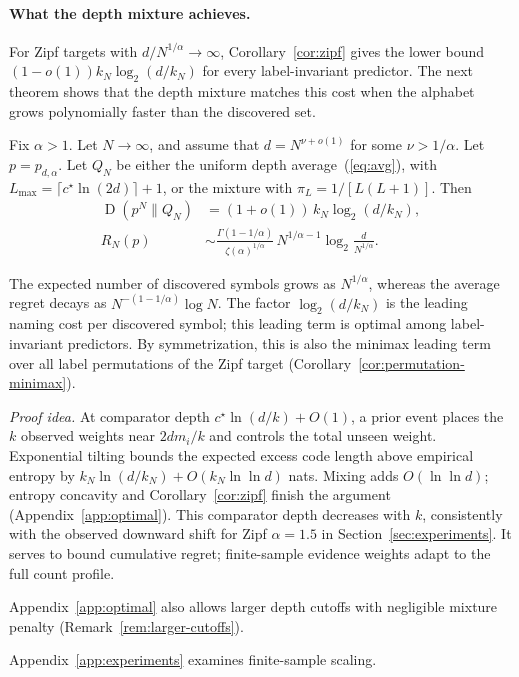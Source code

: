 \documentclass[anon]{alt2027}
\newcommand{\cstar}{c^{\star}}
\newcommand{\Lmax}{L_{\max}}
\newcommand{\KL}{\operatorname{D}}
\renewcommand{\eqref}[1]{(\ref{#1})}
\begin{document}
\paragraph{What the depth mixture achieves.}
For Zipf targets with $d/N^{1/\alpha}\to\infty$, Corollary~\ref{cor:zipf} gives the lower bound $(1-o(1))k_N\log_2(d/k_N)$ for every label-invariant predictor. The next theorem shows that the depth mixture matches this cost when the alphabet grows polynomially faster than the discovered set.
\begin{theorem}
\label{thm:optimal}
Fix $\alpha>1$. Let $N\to\infty$, and assume that $d=N^{\nu+o(1)}$ for some $\nu>1/\alpha$. Let $p=p_{d,\alpha}$. Let $Q_N$ be either the uniform depth average~\eqref{eq:avg}, with $\Lmax=\lceil\cstar\ln(2d)\rceil+1$, or the mixture with $\pi_L=1/[L(L+1)]$. Then
\begin{align}
\label{eq:optimal}
\KL(p^N\|Q_N)&=(1+o(1))\,k_N\log_2(d/k_N),\\
R_N(p)&\sim\frac{\Gamma(1-1/\alpha)}{\zeta(\alpha)^{1/\alpha}}\,N^{1/\alpha-1}\log_2\frac{d}{N^{1/\alpha}}.\nonumber
\end{align}
\end{theorem}
The expected number of discovered symbols grows as $N^{1/\alpha}$, whereas the average regret decays as $N^{-(1-1/\alpha)}\log N$. The factor $\log_2(d/k_N)$ is the leading naming cost per discovered symbol; this leading term is optimal among label-invariant predictors.
By symmetrization, this is also the minimax leading term over all label permutations of the Zipf target (Corollary~\ref{cor:permutation-minimax}).

\emph{Proof idea.} At comparator depth $\cstar\ln(d/k)+O(1)$, a prior event places the $k$ observed weights near $2dm_i/k$ and controls the total unseen weight. Exponential tilting bounds the expected excess code length above empirical entropy by $k_N\ln(d/k_N)+O(k_N\ln\ln d)$ nats. Mixing adds $O(\ln\ln d)$; entropy concavity and Corollary~\ref{cor:zipf} finish the argument (Appendix~\ref{app:optimal}). This comparator depth decreases with $k$, consistently with the observed downward shift for Zipf $\alpha=1.5$ in Section~\ref{sec:experiments}. It serves to bound cumulative regret; finite-sample evidence weights adapt to the full count profile.

Appendix~\ref{app:optimal} also allows larger depth cutoffs with negligible mixture penalty (Remark~\ref{rem:larger-cutoffs}).

Appendix~\ref{app:experiments} examines finite-sample scaling.
\end{document}
